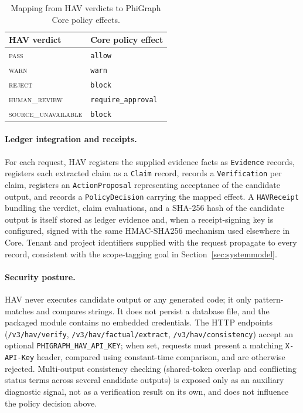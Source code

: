 \documentclass[11pt]{article}
\begin{document}
\begin{table}[H]
\centering
\small
\caption{Mapping from HAV verdicts to PhiGraph Core policy effects.}
\label{tab:hav-mapping}
\begin{tabular}{ll}
\toprule
HAV verdict & Core policy effect \\
\midrule
\textsc{pass} & \texttt{allow} \\
\textsc{warn} & \texttt{warn} \\
\textsc{reject} & \texttt{block} \\
\textsc{human\_review} & \texttt{require\_approval} \\
\textsc{source\_unavailable} & \texttt{block} \\
\bottomrule
\end{tabular}
\end{table}

\paragraph{Ledger integration and receipts.} For each request, HAV registers
the supplied evidence facts as \texttt{Evidence} records, registers each
extracted claim as a \texttt{Claim} record, records a \texttt{Verification}
per claim, registers an \texttt{ActionProposal} representing acceptance of the
candidate output, and records a \texttt{PolicyDecision} carrying the mapped
effect. A \texttt{HAVReceipt} bundling the verdict, claim evaluations, and a
SHA-256 hash of the candidate output is itself stored as ledger evidence and,
when a receipt-signing key is configured, signed with the same HMAC-SHA256
mechanism used elsewhere in Core. Tenant and project identifiers supplied with
the request propagate to every record, consistent with the scope-tagging goal
in Section~\ref{sec:systemmodel}.

\paragraph{Security posture.} HAV never executes candidate output or any
generated code; it only pattern-matches and compares strings. It does not
persist a database file, and the packaged module contains no embedded
credentials. The HTTP endpoints (\texttt{/v3/hav/verify},
\texttt{/v3/hav/factual/extract}, \texttt{/v3/hav/consistency}) accept an
optional \texttt{PHIGRAPH\_HAV\_API\_KEY}; when set, requests must present a
matching \texttt{X-API-Key} header, compared using constant-time comparison,
and are otherwise rejected. Multi-output consistency checking (shared-token
overlap and conflicting status terms across several candidate outputs) is
exposed only as an auxiliary diagnostic signal, not as a verification result
on its own, and does not influence the policy decision above.
\end{document}
